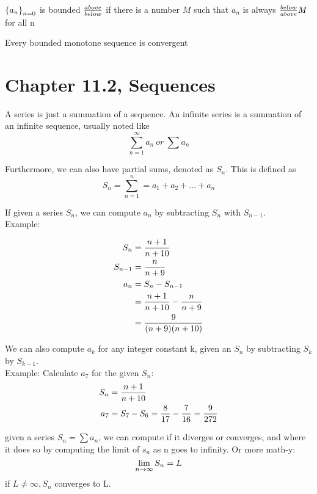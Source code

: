 \documentclass[17pt]{extarticle} %
\begin{document}
\begin{definition}
    $\left\{ a_n \right\}_{n=0}$ is bounded ${above \over below}$ if there is a number $M$ such that $a_n$ is always ${below \over above} M$ for all n
\end{definition}

\begin{theorem*}
    Every bounded monotone sequence is convergent

\end{theorem*}


\newpage
\section{Chapter 11.2, Sequences}

A series is just a summation of a sequence. An infinite series is a summation of an  infinite sequence, usually noted like
$$
\sum^\infty_{n=1}a_n\ or\ \sum a_n
$$

Furthermore, we can also have partial sums, denoted as $S_n$. This is defined as 
$$
S_n = \sum^n_{n=1} = a_1 + a_2 + \ldots + a_n
$$

If given a series $S_n$, we can compute $a_n$ by subtracting $S_n$ with $S_{n-1}$. \\
Example:

$$
\begin{aligned}
    S_n &= {n+1 \over n+10} \\
S_{n-1} &= {n \over n+9} \\
a_n &= S_n - S_{n-1}  \\
&=  {n+1 \over n+10} - {n \over n+9} \\
&= {9 \over (n +9) (n + 10)}
\end{aligned}
$$


We can also compute $a_k$ for any integer constant k, given an $S_n$ by subtracting $S_k$ by $S_{k-1}$. \\
Example: 
Calculate $a_7$ for the given $S_n$:
$$
\begin{aligned}
    S_n &= {n + 1 \over n + 10} \\
    a_7 &= S_7 - S_6 = {8\over 17} - {7 \over 16} = {9\over 272}
\end{aligned}
$$

\begin{theorem*}
    given a series $S_n = \sum a_n$, we can compute if it diverges or converges, and where it does so 
    by computing the limit of $s_n$ as n goes to infinity. Or more math-y: 
    $$
    \lim_{n\to \infty} S_n = L\\
    $$
    if $L \neq \infty , S_n $ converges to L.

\end{theorem*}
\end{document}
